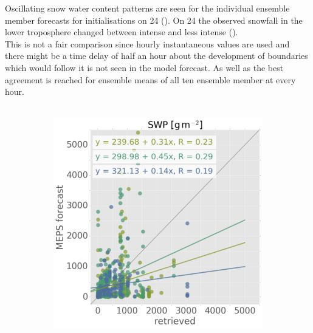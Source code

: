 Oscillating snow water content patterns are seen for the individual ensemble member forecasts for initialisations on \SI{24}{\dec} (). On \SI{24}{\dec} the observed snowfall in the lower troposphere changed between intense and less intense ().
\\
This is not a fair comparison since hourly instantaneous values are used and there might be a time delay of half an hour about the development of boundaries which would follow it is not seen in the model forecast. As well as the best agreement is reached for ensemble means of all ten ensemble member at every hour.
\\
\\
\begin{figure}[ht!]
	\centering
	\begin{subfigure}[b]{0.49\textwidth}
		\includegraphics[width=\textwidth]{./fig_SWP_scat/EM09_20161221_23_00}
		\caption{}\label{fig:SWP:2123}
	\end{subfigure}
	\begin{subfigure}[b]{0.49\textwidth}

\end{subfigure}
\end{figure}
